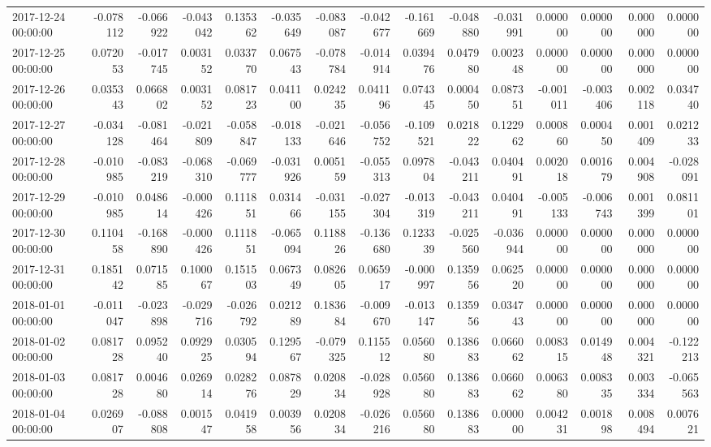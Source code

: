 \begin{tabular}{lrrrrrrrrrrrrrr}
2017-12-24 00:00:00 & -0.078112 & -0.066922 & -0.043042 & 0.135362 & -0.035649 & -0.083087 & -0.042677 & -0.161669 & -0.048880 & -0.031991 & 0.000000 & 0.000000 & 0.000000 & 0.000000 \\
2017-12-25 00:00:00 & 0.072053 & -0.017745 & 0.003152 & 0.033770 & 0.067543 & -0.078784 & -0.014914 & 0.039476 & 0.047980 & 0.002348 & 0.000000 & 0.000000 & 0.000000 & 0.000000 \\
2017-12-26 00:00:00 & 0.035343 & 0.066802 & 0.003152 & 0.081723 & 0.041100 & 0.024235 & 0.041196 & 0.074345 & 0.000450 & 0.087351 & -0.001011 & -0.003406 & 0.002118 & 0.034740 \\
2017-12-27 00:00:00 & -0.034128 & -0.081464 & -0.021809 & -0.058847 & -0.018133 & -0.021646 & -0.056752 & -0.109521 & 0.021822 & 0.122962 & 0.000860 & 0.000450 & 0.001409 & 0.021233 \\
2017-12-28 00:00:00 & -0.010985 & -0.083219 & -0.068310 & -0.069777 & -0.031926 & 0.005159 & -0.055313 & 0.097804 & -0.043211 & 0.040491 & 0.002018 & 0.001679 & 0.004908 & -0.028091 \\
2017-12-29 00:00:00 & -0.010985 & 0.048614 & -0.000426 & 0.111851 & 0.031466 & -0.031155 & -0.027304 & -0.013319 & -0.043211 & 0.040491 & -0.005133 & -0.006743 & 0.001399 & 0.081101 \\
2017-12-30 00:00:00 & 0.110458 & -0.168890 & -0.000426 & 0.111851 & -0.065094 & 0.118826 & -0.136680 & 0.123339 & -0.025560 & -0.036944 & 0.000000 & 0.000000 & 0.000000 & 0.000000 \\
2017-12-31 00:00:00 & 0.185142 & 0.071585 & 0.100067 & 0.151503 & 0.067349 & 0.082605 & 0.065917 & -0.000997 & 0.135956 & 0.062520 & 0.000000 & 0.000000 & 0.000000 & 0.000000 \\
2018-01-01 00:00:00 & -0.011047 & -0.023898 & -0.029716 & -0.026792 & 0.021289 & 0.183684 & -0.009670 & -0.013147 & 0.135956 & 0.034743 & 0.000000 & 0.000000 & 0.000000 & 0.000000 \\
2018-01-02 00:00:00 & 0.081728 & 0.095240 & 0.092925 & 0.030594 & 0.129567 & -0.079325 & 0.115512 & 0.056080 & 0.138683 & 0.066062 & 0.008315 & 0.014948 & 0.004321 & -0.122213 \\
2018-01-03 00:00:00 & 0.081728 & 0.004680 & 0.026914 & 0.028276 & 0.087829 & 0.020834 & -0.028928 & 0.056080 & 0.138683 & 0.066062 & 0.006380 & 0.008335 & 0.003334 & -0.065563 \\
2018-01-04 00:00:00 & 0.026907 & -0.088808 & 0.001547 & 0.041958 & 0.003956 & 0.020834 & -0.026216 & 0.056080 & 0.138683 & 0.000000 & 0.004231 & 0.001898 & 0.008494 & 0.007621 \\

\end{tabular}
